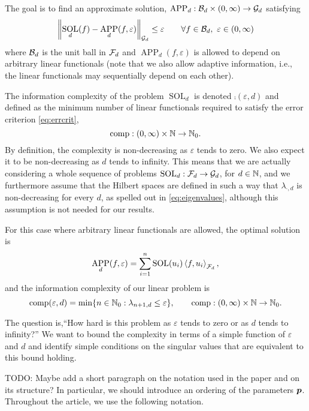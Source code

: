 \documentclass[11pt,a4paper]{article}
\DeclareMathOperator{\SOL}{SOL}
\DeclareMathOperator{\APP}{APP}
\newcommand{\peter}[1]{\begingroup\color{purple}#1\endgroup}
\newcommand{\kachi}[1]{\begingroup\color{ForestGreen}#1\endgroup}
\begin{document}
The goal is to find an approximate solution, $\APP_d:\cb_d \times (0,\infty) \to \cg_d$ satisfying
\begin{equation}
    \label{eq:errcrit}
    \norm[\cg_d]{\SOL_d(f) - \APP_d(f,\varepsilon)} \le \varepsilon \qquad \forall f \in \cb_d, \ \varepsilon \in (0,\infty)
\end{equation}
where $\mathcal{B}_d$ is the unit ball in $\mathcal{F}_d$ and $\APP_d(f,\varepsilon)$ is allowed to depend on arbitrary linear functionals \peter{(note that we also allow adaptive information, i.e., the linear functionals may sequentially depend on each other)}.  

The information complexity of the problem $\SOL_d$ is denoted $\comp(\varepsilon,d)$ and defined as the minimum number of linear functionals required to satisfy the error criterion \eqref{eq:errcrit}, 
\begin{equation*}
\operatorname{comp}:(0,\infty) \times \mathbb{N} \to \mathbb{N}_{0}.
\end{equation*}
By definition, the complexity is non-decreasing  as $\varepsilon$ tends to zero.  We also expect it to be non-decreasing as $d$ tends to infinity.  \peter{This means that we are actually considering 
a whole sequence of problems  $\SOL_d : \cf_d \to \cg_d$, for $d\in\mathbb{N}$, and we furthermore assume} that the Hilbert spaces are defined in such a way that $\lambda_{\cdot,d}$ is non-decreasing for every $d$, as spelled out in \eqref{eq:eigenvalues}, although this assumption is not needed for our results.

For this case where arbitrary linear functionals are allowed, the optimal solution is
\[
\APP_d(f,\varepsilon) = \sum_{i=1}^n \SOL(u_i) \ip[\cf_d]{f}{u_i},
\]
and the \peter{information} complexity of our linear problem is
\begin{equation}\label{eq:comp_def}
\operatorname{comp}(\varepsilon, d) = \min \{n \in \mathbb{N}_{0} : \lambda_{n+1, d} \le \varepsilon\}, \qquad \operatorname{comp}:(0,\infty) \times \mathbb{N} \to \mathbb{N}_{0}.
\end{equation}


The question is,``How hard is this problem as $\varepsilon$ tends to zero or as $d$ tends to infinity?''  We want to bound the complexity in terms of a simple function of $\varepsilon$ and $d$ and identify simple conditions on the singular values that are equivalent to this bound holding.

\peter{TODO: Maybe add a short paragraph on the notation used in the paper and on its structure? In particular, we should introduce 
an ordering of the parameters $\boldsymbol{p}$.}\\
\kachi{Throughout the article, we use the following notation.}\\
\end{document}
